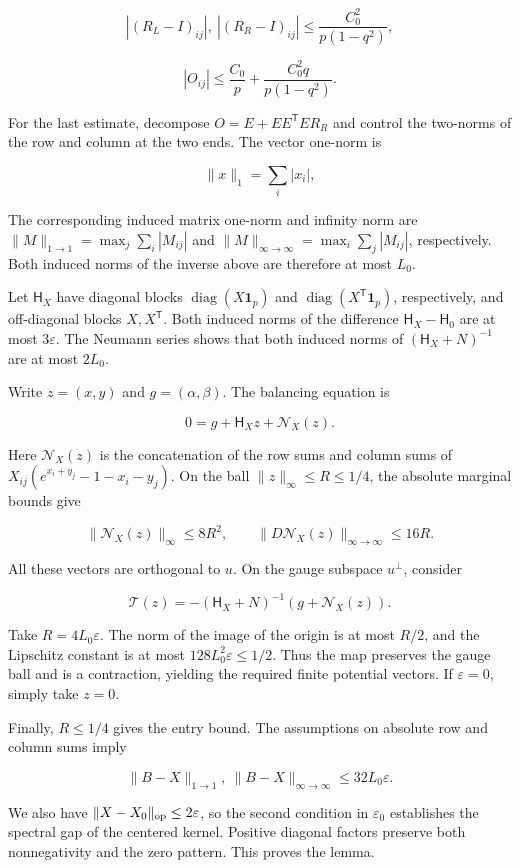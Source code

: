 \documentclass[11pt,a4paper]{article}
\begin{document}
\[
|(R_L-I)_{ij}|,\ |(R_R-I)_{ij}|\le\frac{C_0^2}{p(1-q^2)},
\]

\[
|O_{ij}|\le\frac{C_0}{p}+\frac{C_0^2q}{p(1-q^2)}.
\]

For the last estimate, decompose \(O=E+EE^{\mathsf T}ER_R\) and control the two-norms of the row and column at the two ends. The vector one-norm is

\[
\|x\|_1=\sum_i|x_i|,
\]

The corresponding induced matrix one-norm and infinity norm are \(\|M\|_{1\to1}=\max_j\sum_i|M_{ij}|\) and \(\|M\|_{\infty\to\infty}=\max_i\sum_j|M_{ij}|\), respectively. Both induced norms of the inverse above are therefore at most \(L_0\).

Let \(\mathsf H_X\) have diagonal blocks \(\operatorname{diag}(X\mathbf 1_p)\) and \(\operatorname{diag}(X^{\mathsf T}\mathbf 1_p)\), respectively, and off-diagonal blocks \(X,X^{\mathsf T}\). Both induced norms of the difference \(\mathsf H_X-\mathsf H_0\) are at most \(3\varepsilon\). The Neumann series shows that both induced norms of \((\mathsf H_X+N)^{-1}\) are at most \(2L_0\).

Write \(z=(x,y)\) and \(g=(\alpha,\beta)\). The balancing equation is

\[
0=g+\mathsf H_Xz+\mathcal N_X(z).
\]

Here \(\mathcal N_X(z)\) is the concatenation of the row sums and column sums of \(X_{ij}(e^{x_i+y_j}-1-x_i-y_j)\). On the ball \(\|z\|_\infty\le R\le1/4\), the absolute marginal bounds give

\[
\|\mathcal N_X(z)\|_\infty\le8R^2,\qquad \|D\mathcal N_X(z)\|_{\infty\to\infty}\le16R.
\]

All these vectors are orthogonal to \(u\). On the gauge subspace \(u^\perp\), consider

\[
\mathcal T(z)=-(\mathsf H_X+N)^{-1}(g+\mathcal N_X(z)).
\]

Take \(R=4L_0\varepsilon\). The norm of the image of the origin is at most \(R/2\), and the Lipschitz constant is at most \(128L_0^2\varepsilon\le1/2\). Thus the map preserves the gauge ball and is a contraction, yielding the required finite potential vectors. If \(\varepsilon=0\), simply take \(z=0\).

Finally, \(R\le1/4\) gives the entry bound. The assumptions on absolute row and column sums imply

\[
\|B-X\|_{1\to1},\ \|B-X\|_{\infty\to\infty}\le32L_0\varepsilon.
\]

We also have \(\|X-X_0\|_{\rm op}\le2\varepsilon\), so the second condition in \(\varepsilon_0\) establishes the spectral gap of the centered kernel. Positive diagonal factors preserve both nonnegativity and the zero pattern. This proves the lemma.
\end{document}
